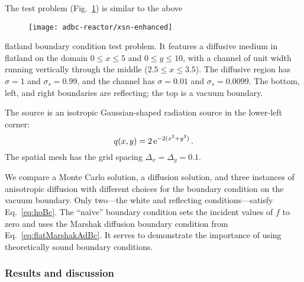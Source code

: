 The test problem (Fig.~\ref{fig:bcReactorProblem}) is similar to the above
%
\begin{figure}[htb]
  \centering
  \texttt{[image: adbc-reactor/xsn-enhanced]}
  \label{fig:bcReactorProblem}
\end{figure}
%
flatland boundary condition test
problem. It features a diffusive medium in flatland on the domain $0
\le x \le 5$ and $0 \le y \le 10$, with a channel of unit width running
vertically through the middle ($2.5 \le x \le 3.5$). The diffusive region has
$\sigma=1$ and $\sigma_s=0.99$, and the channel has $\sigma=0.01$ and
$\sigma_s=0.0099$. The bottom, left, and right boundaries are reflecting; the
top is a vacuum boundary.

The source is an isotropic Gaussian-shaped radiation source in the lower-left
corner:
\begin{equation*}
  q(x,y) = 2 \mathop{}\!\mathrm{e}^{-2 (x^2 + y^2) } \,.
\end{equation*}
The spatial mesh has the grid spacing $\Delta_x = \Delta_y = 0.1$.

We compare a Monte Carlo solution, a diffusion solution, and three instances of
anisotropic diffusion with different choices for the boundary condition on the
vacuum boundary. Only two---the white and reflecting
conditions---satisfy Eq.~\eqref{eq:hoBc}. The ``na\"ive'' boundary condition
sets the incident values of $f$ to zero and uses the Marshak diffusion boundary
condition from Eq.~\eqref{eq:flatMarshakAdBc}. It serves to demonstrate the
importance of using theoretically sound boundary conditions.

\subsubsection{Results and discussion}

